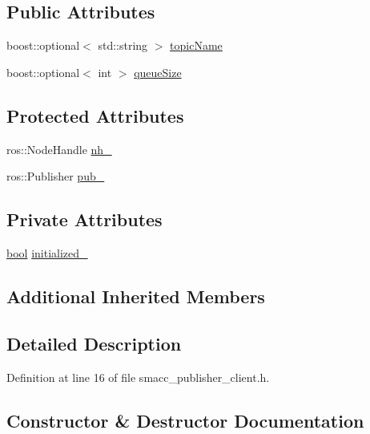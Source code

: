 \subsection*{Public Attributes}
\begin{DoxyCompactItemize}
\item 
boost\+::optional$<$ std\+::string $>$ \hyperlink{classsmacc_1_1client__bases_1_1SmaccPublisherClient_a8b8d98aef9b3b3a441005d2cb17b4fcc}{topic\+Name}
\item 
boost\+::optional$<$ int $>$ \hyperlink{classsmacc_1_1client__bases_1_1SmaccPublisherClient_a1a9b98681b01953f134191799a029fd3}{queue\+Size}
\end{DoxyCompactItemize}
\subsection*{Protected Attributes}
\begin{DoxyCompactItemize}
\item 
ros\+::\+Node\+Handle \hyperlink{classsmacc_1_1client__bases_1_1SmaccPublisherClient_a83a44b5a1afd4d45140d4936f4011cc9}{nh\+\_\+}
\item 
ros\+::\+Publisher \hyperlink{classsmacc_1_1client__bases_1_1SmaccPublisherClient_af39f498e73e8f956aae312065a4fd093}{pub\+\_\+}
\end{DoxyCompactItemize}
\subsection*{Private Attributes}
\begin{DoxyCompactItemize}
\item 
\hyperlink{classbool}{bool} \hyperlink{classsmacc_1_1client__bases_1_1SmaccPublisherClient_acb2fbd8b9797ce286d9ecc0419e2cc55}{initialized\+\_\+}
\end{DoxyCompactItemize}
\subsection*{Additional Inherited Members}


\subsection{Detailed Description}


Definition at line 16 of file smacc\+\_\+publisher\+\_\+client.\+h.



\subsection{Constructor \& Destructor Documentation}
